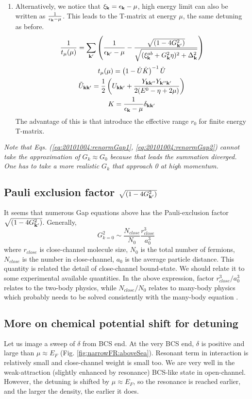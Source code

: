 \begin{enumerate}
\item  Alternatively, we notice that $\xi_{\mathbf{k}}=\epsilon_{\mathbf{k}}-\mu$, high energy limit can also be written as 
$\frac{1}{\epsilon_{\mathbf{k}}-\mu}$.  This leads to the T-matrix at energy $\mu$, the same detuning as before.  
\begin{equation}\label{eq:20101004:renormGap2}
\frac{1}{{t_{\mu}}(\mu)}=\sum_{\mathbf{k}'}
\left(\frac{1}{\epsilon_{\mathbf{k}'}-\mu}-\frac{\sqrt{(1-4G_{\mathbf{k}'}^{2})}}{\sqrt{{(\xi^{ab}_{\mathbf{k}}+  G_{\mathbf{k}}^2\eta)^{2}+\Delta_{\mathbf{k}}^{2}}}}\right)
\end{equation} 
\begin{gather}
{t_{\mu}}(\mu)=\left(1-\tilde{U}\tilde{ K}\right)^{-1}\tilde{U}\label{eq:20101004:t02}\\
\tilde{U}_{\mathbf{k}\mathbf{k}'}=\frac{1}{2} \left(U_{\mathbf{k}\mathbf{k}'}+\frac{Y_{\mathbf{k}\mathbf{k}''}Y_{\mathbf{k}''\mathbf{k}'}}{2(E^{0}-\eta+2\mu)}\right)\label{eq:20101004:tu2}\\
{K}=\frac{1}{\epsilon_{\mathbf{k}}-\mu}\delta_{\mathbf{k}\mathbf{k}'}\label{eq:20101004:tk2}
\end{gather}
The advantage of this is that introduce the effective range $r_{0}$ for finite energy T-matrix. 
\end{enumerate}
\emph{Note that Eqs. (\ref{eq:20101004:renormGap1}, \ref{eq:20101004:renormGap2}) cannot take the approximation of $G_{k}\approx{G_{0}}$ because that leads the summation diverged.  One has to take a more realistic $G_{k}$ that approach 0 at high momentum.  }
\subsection{Pauli exclusion factor  $\sqrt{(1-4G_{\mathbf{k}'}^{2})}$ }
It seems that numerous Gap equations above has the Pauli-exclusion factor $\sqrt{(1-4G_{\mathbf{k}'}^{2})}$.  Generally, 
\begin{equation}
G_{k=0}^{2}\sim{\frac{N_{close}}{N_{0}}\frac{r_{close}^{3}}{a_{0}^{3}}}
\end{equation}
where $r_{close}$ is close-channel molecule size, $N_{0}$ is the total number of fermions, $N_{close}$ is the number in close-channel, $a_{0}$ is the average particle distance.  This quantity is related the detail of close-channel bound-state.  We should relate it to some experimental available quantities.  In the above expression, factor $r_{close}^{3}/a_{0}^{3}$ relates to the two-body physics, while $N_{close}/N_{0}$ relates to many-body physics which probably needs to be solved consistently with the many-body equation .  

\subsection{More on chemical potential shift for detuning}
Let us image a sweep of $\delta$ from BCS end.  At the very BCS end, $\delta$ is positive and large than $\mu\approx{}E_{F}$ (Fig. \ref{fig:narrowFR:aboveSea}). Resonant term in interaction is relatively small and close-channel weight is small too.  We are very well in the  weak-attraction (slightly enhanced by resonance) BCS-like state in open-channel.  However, the detuning is shifted by $\mu\approx{}E_{F}$, so the resonance is reached earlier, and the larger the density, the earlier it does.  

